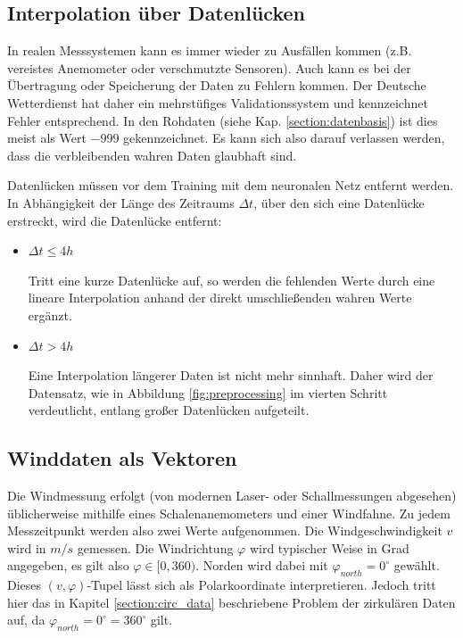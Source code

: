 \documentclass[
12pt, %
toc=listofnumbered, %
toc=chapterentrydotfill, %
numbers=noenddot, %
captions=tableheading, %
bibliography=numbered
]{scrreprt}
\let\Oldsubsection\subsection
\renewcommand{\subsection}{\FloatBarrier\Oldsubsection}
\newcommand{\qm}[1]{\glqq#1\grqq{}} %
\begin{document}
\subsection{Interpolation über Datenlücken}\label{section:Datenlücken}

In realen Messsystemen kann es immer wieder zu Ausfällen kommen (z.B. vereistes Anemometer oder verschmutzte Sensoren). Auch kann es bei der Übertragung oder Speicherung der Daten zu Fehlern kommen. Der Deutsche Wetterdienst hat daher ein mehrstüfiges Validationssystem und kennzeichnet Fehler entsprechend. In den Rohdaten (siehe Kap. \ref{section:datenbasis}) ist dies meist als Wert $-999$ gekennzeichnet. Es kann sich also darauf verlassen werden, dass die verbleibenden \qm{wahren} Daten glaubhaft sind. 

Datenlücken müssen vor dem Training mit dem neuronalen Netz entfernt werden. In Abhängigkeit der Länge des Zeitraums $\Delta t$, über den sich eine Datenlücke erstreckt, wird die Datenlücke entfernt:

\begin{itemize}
	\item $\Delta t \leq 4h$
	
	Tritt eine kurze Datenlücke auf, so werden die fehlenden Werte durch eine lineare Interpolation anhand der direkt umschließenden wahren Werte ergänzt.

	\item $\Delta t > 4h$

	Eine Interpolation längerer Daten ist nicht mehr sinnhaft. Daher wird der Datensatz, wie in Abbildung \ref{fig:preprocessing} im vierten Schritt verdeutlicht, entlang großer Datenlücken aufgeteilt.

\end{itemize}

\subsection{Winddaten als Vektoren}\label{section:Winddaten_vec}
Die Windmessung erfolgt (von modernen Laser- oder Schallmessungen abgesehen) üblicherweise mithilfe eines Schalenanemometers und einer Windfahne. Zu jedem Messzeitpunkt werden also zwei Werte aufgenommen. Die Windgeschwindigkeit $v$ wird in $m/s$ gemessen. Die Windrichtung $\varphi$ wird typischer Weise in Grad angegeben, es gilt also $\varphi \in [0,360)$. Norden wird dabei mit $\varphi_{north} = 0^\circ$ gewählt. Dieses $(v,\varphi)$-Tupel lässt sich als Polarkoordinate interpretieren. Jedoch tritt hier das in Kapitel \ref{section:circ_data} beschriebene Problem der zirkulären Daten auf, da $\varphi_{north} = 0^\circ = 360^\circ$ gilt.
\end{document}
